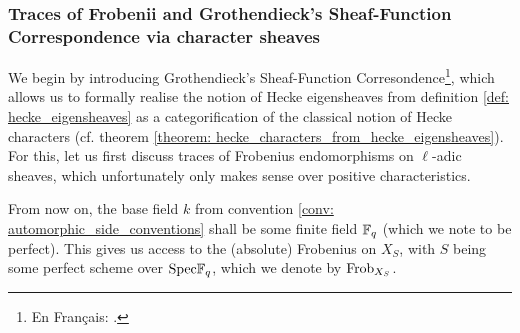         \subsubsection{Traces of Frobenii and Grothendieck's Sheaf-Function Correspondence via character sheaves}
            We begin by introducing Grothendieck's Sheaf-Function Corresondence\footnote{En Français: .}, which allows us to formally realise the notion of Hecke eigensheaves from definition \ref{def: hecke_eigensheaves} as a categorification of the classical notion of Hecke characters (cf. theorem \ref{theorem: hecke_characters_from_hecke_eigensheaves}). For this, let us first discuss traces of Frobenius endomorphisms on $\ell$-adic sheaves, which unfortunately only makes sense over positive characteristics.
            \begin{convention} \label{conv: frobenii}
                From now on, the base field $k$ from convention \ref{conv: automorphic_side_conventions} shall be some finite field $\mathbb{F}_q$ (which we note to be perfect). This gives us access to the (absolute) Frobenius on $X_S$, with $S$ being some perfect scheme over $\mathrm{Spec} \mathbb{F}_q$, which we denote by $\mathrm{Frob}_{X_S}$.
            \end{convention}
            

